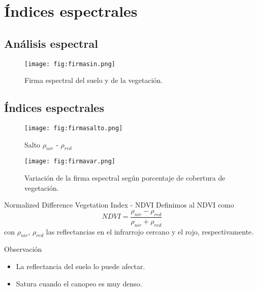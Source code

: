 \section{Índices espectrales}
\subsection{Análisis espectral}

\begin{frame}{}
  \begin{figure}
    \centering
    \texttt{[image: fig:firmasin.png]}
    \caption{Firma espectral del suelo y de la vegetación.}
    \label{}
  \end{figure}
\end{frame}
\subsection{Índices espectrales}

\begin{frame}{}
  \begin{figure}
    \centering
    \texttt{[image: fig:firmasalto.png]}
    \caption{Salto $\rho_{nir}$ - $\rho_{red}$}
    \label{}
  \end{figure}
\end{frame}

\begin{frame}{}
  \begin{figure}
    \centering
    \texttt{[image: fig:firmavar.png]}
    \caption{Variación de la firma espectral según porcentaje de cobertura de vegetación.}
    \label{}
  \end{figure}
\end{frame}




\begin{frame}{}
\begin{block}{Normalized Difference Vegetation Index - NDVI}
  Definimos al NDVI como
  \begin{equation}
    NDVI = \frac{\rho_{nir}-\rho_{red}}{\rho_{nir}+\rho_{red}}
  \end{equation}
  con $\rho_{nir}$, $\rho_{red}$ las reflectancias en el infrarrojo cercano y el rojo, respectivamente.
\end{block}
\begin{block}{Observación}
    \begin{itemize}[<+->]
        \item La reflectancia del suelo lo puede afectar.
        \item Satura cuando el canopeo es muy denso.
    \end{itemize}
\end{block}
\end{frame}

